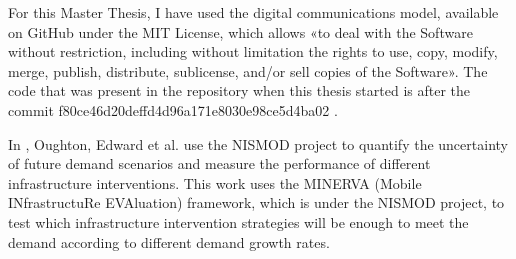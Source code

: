 
For this Master Thesis, I have used the digital communications model, available on GitHub \cite{3-04} under the MIT License, which allows «to deal with the Software without restriction, including without limitation the rights to use, copy, modify, merge, publish, distribute, sublicense, and/or sell copies of the Software». The code that was present in the repository when this thesis started is after the commit f80ce46d20deffd4d96a171e8030e98ce5d4ba02 \cite{3-09}.\par

In \cite{3-03}, Oughton, Edward et al. use the NISMOD project to quantify the uncertainty of future demand scenarios and measure the performance of different infrastructure interventions. This work uses the MINERVA (Mobile INfrastructuRe EVAluation) framework, which is under the NISMOD project, to test which infrastructure intervention strategies will be enough to meet the demand according to different demand growth rates.\par







